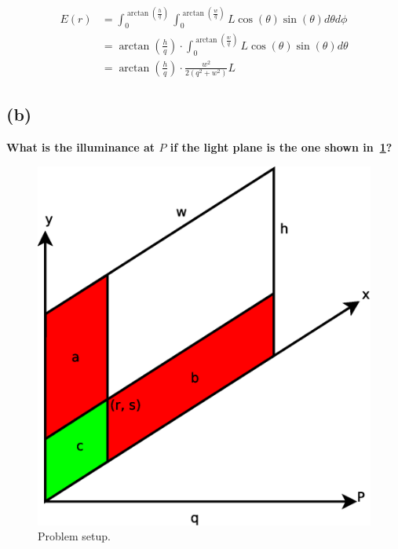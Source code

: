 \documentclass{report}
\begin{document}
\begin{align}
E(r) &= \int_{0}^{\arctan(\frac{h}{q})} \int_{0}^{\arctan(\frac{w}{q})} L\cos(\theta) \sin(\theta) d\theta d\phi \\
     &= \arctan\left(\frac{h}{q}\right) \cdot \int_{0}^{\arctan(\frac{w}{q})} L\cos(\theta) \sin(\theta) d\theta \\
     &= \arctan\left(\frac{h}{q}\right) \cdot \frac{w^2}{2 \left(q^2 + w^2\right)} L
\end{align}



\subsection{(b)}
\textbf{What is the illuminance at $P$ if the light plane is the one shown in~\ref{q2b:setup}?}

\begin{figure}
  \centering
  \includegraphics[width=0.33\linewidth]{q2b_setup.eps}
  \caption[Problem setup]
   {Problem setup.}
  \label{q2b:setup}
\end{figure}
\end{document}
